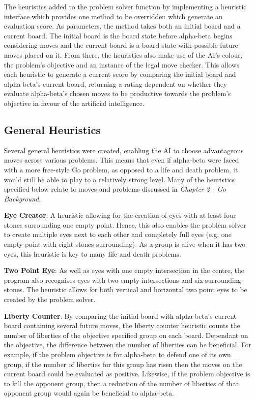 \documentclass{l3proj}
\begin{document}
The heuristics added to the problem solver function by implementing a heuristic interface which provides one method to be overridden which generate an evaluation score. As parameters, the method takes both an initial board and a current board. The initial board is the board state before alpha-beta begins considering moves and the current board is a board state with possible future moves placed on it. From there, the heuristics also make use of the AI's colour, the problem's objective and an instance of the legal move checker. This allows each heuristic to generate a current score by comparing the initial board and alpha-beta's current board, returning a rating dependent on whether they evaluate alpha-beta's chosen moves to be productive towards the problem's objective in favour of the artificial intelligence.

\subsection{General Heuristics}

Several general heuristics were created, enabling the AI to choose advantageous moves across various problems. This means that even if alpha-beta were faced with a more free-style Go problem, as opposed to a life and death problem, it would still be able to play to a relatively strong level. Many of the heuristics specified below relate to moves and problems discussed in \textit{Chapter 2 - Go Background}.

\textbf{Eye Creator}: A heuristic allowing for the creation of eyes with at least four stones surrounding one empty point. Hence, this also enables the problem solver to create multiple eyes next to each other and completely full eyes (e.g. one empty point with eight stones surrounding). As a group is alive when it has two eyes, this heuristic is key to many life and death problems.

\textbf{Two Point Eye}: As well as eyes with one empty intersection in the centre, the program also recognises eyes with two empty intersections and six surrounding stones. The heuristic allows for both vertical and horizontal two point eyes to be created by the problem solver.

\textbf{Liberty Counter}: By comparing the initial board with alpha-beta's current board containing several future moves, the liberty counter heuristic counts the number of liberties of the objective specified group on each board. Dependant on the objective, the difference between the number of liberties can be beneficial. For example, if the problem objective is for alpha-beta to defend one of its own group, if the number of liberties for this group has risen then the moves on the current board could be evaluated as positive. Likewise, if the problem objective is to kill the opponent group, then a reduction of the number of liberties of that opponent group would again be beneficial to alpha-beta.
\end{document}
